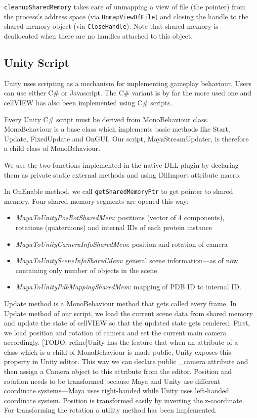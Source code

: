 \documentclass[
  digital, %
  table,   %
  nolof,     %
  nolot,     %
]{fithesis3}
\begin{document}
\texttt{cleanupSharedMemory} takes care of unmapping a view of file (the pointer) from the process's address space (via \texttt{UnmapViewOfFile}) and closing the handle to the shared memory object (via \texttt{CloseHandle}). Note that shared memory is deallocated when there are no handles attached to this object.

\subsection{Unity Script}
Unity uses scripting as a mechanism for implementing gameplay behaviour. Users can use either C\# or Javascript. The C\# variant is by far the more used one and cellVIEW has also been implemented using C\# scripts.

Every Unity C\# script must be derived from MonoBehaviour class. MonoBehaviour is a base class which implements basic methods like Start, Update, FixedUpdate and OnGUI. Our script, MayaStreamUpdater, is therefore a child class of MonoBehaviour.

We use the two functions implemented in the native DLL plugin by declaring them as private static external methods and using DllImport attribute macro.

In OnEnable method, we call \texttt{getSharedMemoryPtr} to get pointer to shared memory. Four shared memory segments are opened this way:
\begin{itemize}
\item \textit{MayaToUnityPosRotSharedMem}: positions (vector of 4 components), rotations (quaternions) and internal IDs of each protein instance
\item \textit{MayaToUnityCameraInfoSharedMem}: position and rotation of camera
\item \textit{MayaToUnitySceneInfoSharedMem}: general scene information—as of now containing only number of objects in the scene
\item \textit{MayaToUnityPdbMappingSharedMem}: mapping of PDB ID to internal ID.
\end{itemize}

Update method is a MonoBehaviour method that gets called every frame. In Update method of our script, we load the current scene data from shared memory and update the state of cellVIEW so that the updated state gets rendered. First, we load position and rotation of camera and set the current main camera accordingly. [TODO: refine]Unity has the feature that when an attribute of a class which is a child of MonoBehaviour is made public, Unity exposes this property in Unity editor. This way we can declare public \_camera attribute and then assign a Camera object to this attribute from the editor. Position and rotation needs to be transformed because Maya and Unity use different coordinate systems—Maya uses right-handed while Unity uses left-handed coordinate system. Position is transformed easily by inverting the z-coordinate. For transforming the rotation a utility method has been implemented.
\end{document}
